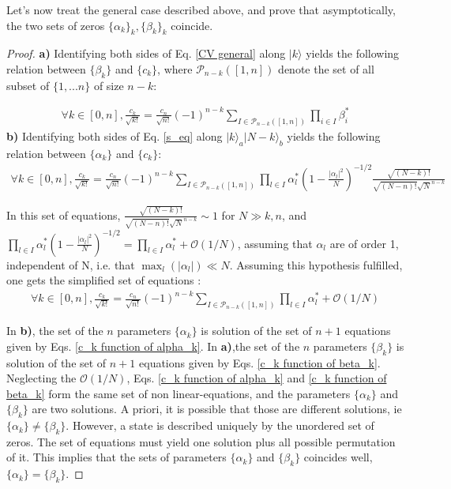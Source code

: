 \documentclass[aps,prl,showpacs,twocolumn]{revtex4-2}
\providecommand{\ket}[1]{\lvert #1 \rangle}
\providecommand{\ket}[1]{\lvert #1 \rangle}
\providecommand{\ket}[1]{\lvert #1 \rangle}
\providecommand{\ket}[1]{\lvert #1 \rangle}
\begin{document}
Let's now treat the general case described above, and prove that asymptotically, the two sets of zeros $\{\alpha_k\}_k, \{\beta_k\}_k$ coincide.

\begin{proof}


	\textbf{a)} Identifying both sides of Eq. \ref{CV general} along $\ket{k}$ yields the following relation between $\{\beta_k\}$ and $\{c_k\}$, where $\mathcal{P}_{n-k}([1,n])$ denote the set of all subset of $\{ 1, ...n \} $ of size $n-k$:

	\begin{align}\label{c_k function of beta_k}
		\forall k\in [0,n] ,  \frac{c_k}{\sqrt{k!}}=\frac{c_n}{\sqrt{n!}}(-1)^{n-k}\sum_{I\in\mathcal{P}_{n-k}([1,n]) }\prod_{i\in I}\beta^*_i
	\end{align}
	\textbf{ b)} Identifying both sides of Eq. \ref{s_eq} along $\ket{k}_a\ket{N-k}_b$ yields the following relation between $\{\alpha_k\}$ and $\{c_k\}$:
    \begin{align*}
		\forall k\in [0,n],   \frac{c_k}{\sqrt{k!}}=\frac{c_n}{\sqrt{n!}}(-1)^{n-k}\sum_{I\in\mathcal{P}_{n-k}([1,n]) }\prod_{l\in I}\alpha^*_l\left(1-\frac{|\alpha_l|^2}{N}\right)^{-1/2}\frac{\sqrt{(N-k)!}}{\sqrt{(N-n)!}\sqrt{N}^{n-k}}
	\end{align*}

	In this set of equations, $\frac{\sqrt{(N-k)!}}{\sqrt{(N-n)!}\sqrt{N}^{n-k}} \sim 1 $ for $N\gg k,n$, and $\prod_{l\in I}\alpha^*_l\left(1-\frac{|\alpha_l|^2}{N}\right)^{-1/2}= \prod_{l\in I}\alpha^*_l + \mathcal{O}(1/N)$, assuming that $\alpha_l$ are of order 1, independent of N, i.e. that $\max_l(|\alpha_l|)\ll N $. Assuming this hypothesis fulfilled, one gets the simplified set of equations :
	\begin{align} \label{c_k function of alpha_k}
		\forall k\in [0, n],  \frac{c_k}{\sqrt{k!}}=\frac{c_n}{\sqrt{n!}}(-1)^{n-k}\sum_{I\in\mathcal{P}_{n-k}([1,n]) }\prod_{l\in I}\alpha^*_l + \mathcal{O}(1/N)
	\end{align}

	In \textbf{ b)}, the set of the $n$ parameters $\{\alpha_k\}$ is solution of the set of $n+1 $  equations given by Eqs. \ref{c_k function of alpha_k}. In \textbf{ a)},the set of the $n$ parameters $\{\beta_k\}$ is solution of the set of $n+1 $ equations given by Eqs. \ref{c_k function of beta_k}. Neglecting the $\mathcal{O}(1/N)$, Eqs. \ref{c_k function of alpha_k}  and \ref{c_k function of beta_k} form the same set of non linear-equations, and the parameters $\{\alpha_k\}$  and  $\{\beta_k\}$ are two solutions.  A priori, it is possible that  those are different solutions, ie $\{\alpha_k\} \neq \{\beta_k\}$. However, a state is described uniquely by the unordered set of zeros. The set of equations must yield one solution plus all possible permutation of it. This implies that the sets of parameters  $\{\alpha_k\}$  and  $\{\beta_k\}$ coincides well, $\{\alpha_k\}=\{\beta_k\}$.
\end{proof}






\end{document}
